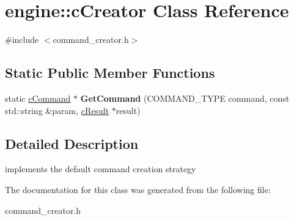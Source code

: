 \hypertarget{classengine_1_1cCreator}{\section{engine\-:\-:c\-Creator \-Class \-Reference}
\label{classengine_1_1cCreator}
}


{\ttfamily \#include $<$command\-\_\-creator.\-h$>$}

\subsection*{\-Static \-Public \-Member \-Functions}
\begin{DoxyCompactItemize}
\item 
\hypertarget{classengine_1_1cCreator_a67c7b575c0a32a48bb2428d263ccd3e0}{static \hyperlink{classengine_1_1cCommand}{c\-Command} $\ast$ {\bfseries \-Get\-Command} (\-C\-O\-M\-M\-A\-N\-D\-\_\-\-T\-Y\-P\-E command, const std\-::string \&param, \hyperlink{classengine_1_1cResult}{c\-Result} $\ast$result)}\label{classengine_1_1cCreator_a67c7b575c0a32a48bb2428d263ccd3e0}

\end{DoxyCompactItemize}


\subsection{\-Detailed \-Description}
implements the default command creation strategy 

\-The documentation for this class was generated from the following file\-:\begin{DoxyCompactItemize}
\item 
command\-\_\-creator.\-h\end{DoxyCompactItemize}
